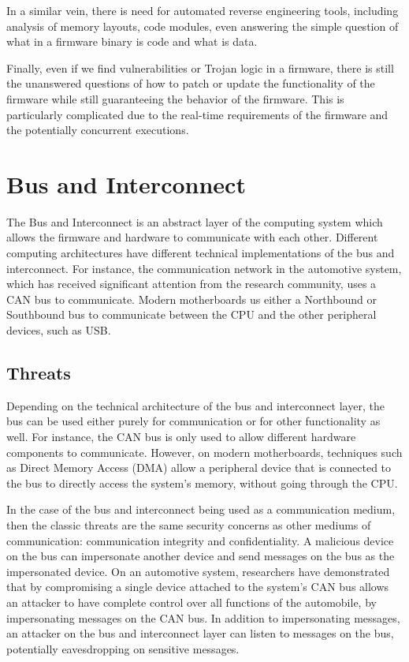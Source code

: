 \documentclass[11pt,letterpaper]{article}
\begin{document}
In a similar vein, there is need for automated reverse engineering tools,
including analysis of memory layouts, code modules, even answering the
simple question of what in a firmware binary is code and what is data.

Finally, even if we find vulnerabilities or Trojan logic in a
firmware, there is still the unanswered questions of how to patch or
update the functionality of the firmware while still guaranteeing the
behavior of the firmware. This is particularly complicated due to the
real-time requirements of the firmware and the potentially concurrent
executions. 

\section{Bus and Interconnect}

The Bus and Interconnect is an abstract layer of the computing system
which allows the firmware and hardware to communicate with each other.
Different computing architectures have different technical
implementations of the bus and interconnect. For instance, the
communication network in the automotive system, which has received
significant attention from the research community, uses a CAN bus to
communicate. Modern motherboards us either a Northbound or Southbound
bus to communicate between the CPU and the other peripheral devices,
such as USB.

\subsection{Threats}

Depending on the technical architecture of the bus and interconnect
layer, the bus can be used either purely for communication or for
other functionality as well. For instance, the CAN bus is only used to
allow different hardware components to communicate. However, on modern
motherboards, techniques such as Direct Memory Access (DMA) allow a
peripheral device that is connected to the bus to directly access the
system's memory, without going through the CPU. 

In the case of the bus and interconnect being used as a communication
medium, then the classic threats are the same security concerns as
other mediums of communication: communication integrity and
confidentiality. A malicious device on the bus can impersonate another
device and send messages on the bus as the impersonated device. On an
automotive system, researchers have demonstrated that by compromising
a single device attached to the system's CAN bus allows an attacker to
have complete control over all functions of the automobile, by
impersonating messages on the CAN bus. In addition to impersonating
messages, an attacker on the bus and interconnect layer can listen to
messages on the bus, potentially eavesdropping on sensitive messages.
\end{document}
